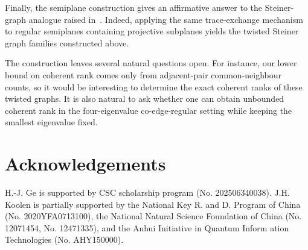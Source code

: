 \documentclass[reqno,a4paper,11pt]{article}
\theoremstyle{definition}
\theoremstyle{remark}
\begin{document}
Finally, the semiplane construction gives an affirmative answer to the
Steiner-graph analogue raised in~\cite[Problem~34(2)]{GeKoolen2025}.
Indeed, applying the same trace-exchange mechanism to regular semiplanes
containing projective subplanes yields the twisted Steiner graph families
constructed above.

The construction leaves several natural questions open.  For instance,
our lower bound on coherent rank comes only from adjacent-pair
common-neighbour counts, so it would be interesting to determine the exact
coherent ranks of these twisted graphs.  It is also natural to ask whether
one can obtain unbounded coherent rank in the four-eigenvalue
co-edge-regular setting while keeping the smallest eigenvalue fixed.

\section*{Acknowledgements}
 H.-J. Ge is supported by CSC scholarship program (No.  202506340038).
J.H. Koolen is partially supported by the National Key R. and D. Program of China (No. 2020YFA0713100), the National Natural Science Foundation of China 
(No. 12071454, No. 12471335), and the Anhui Initiative in Quantum Inform
ation Technologies (No. AHY150000).  





\end{document}
